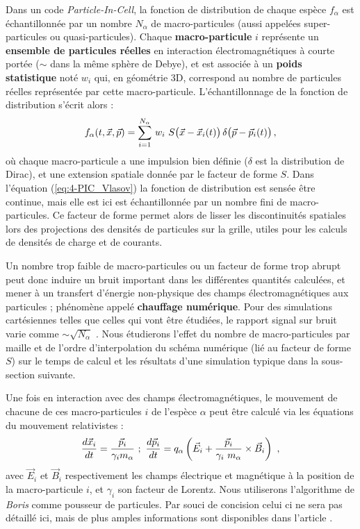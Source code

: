 \begin{refsection}
Dans un code \textit{Particle-In-Cell}, la fonction de distribution de chaque espèce $f_\alpha$ est échantillonnée par un nombre $N_\alpha$ de macro-particules (aussi appelées super-particules ou quasi-particules). Chaque \textbf{macro-particule} $i$ représente un \textbf{ensemble de particules réelles} en interaction électromagnétiques à courte portée ($\sim$ dans la même sphère de Debye), et est associée à un \textbf{poids statistique} noté $w_i$ qui, en géométrie 3D, correspond au nombre de particules réelles représentée par cette macro-particule. 
L'échantillonnage de la fonction de distribution s'écrit alors \parencite{derouillat_2018} :
\begin{equation}
f_\alpha(t,\vec{x},\vec{p}) =
    \sum_{i=1}^{N_\alpha}\,w_i\,\,S\big(\vec{x}-\vec{x}_i(t)\big)\,\delta\big(\vec{p}-\vec{p}_i(t)\big)\,\rm ,
\end{equation}
où chaque macro-particule a une impulsion bien définie ($\delta$ est la distribution de Dirac), et une extension spatiale donnée par le facteur de forme $S$. Dans l'équation (\ref{eq:4-PIC_Vlasov}) la fonction de distribution est sensée être continue, mais elle est ici est échantillonnée par un nombre fini de macro-particules. Ce facteur de forme permet alors de lisser les discontinuités spatiales lors des projections des densités de particules sur la grille, utiles pour les calculs de densités de charge et de courants.

Un nombre trop faible de macro-particules ou un facteur de forme trop abrupt peut donc induire un bruit important dans les différentes quantités calculées, et mener à un transfert d'énergie non-physique des champs électromagnétiques aux particules ; phénomène appelé \textbf{chauffage numérique}. Pour des simulations cartésiennes telles que celles qui vont être étudiées, le rapport signal sur bruit varie comme $\sim \sqrt{N_\alpha}$ \parencite{lifschitz_2009}. Nous étudierons l'effet du nombre de macro-particules par maille et de l'ordre d'interpolation du schéma numérique (lié au facteur de forme $S$) sur le temps de calcul et les résultats d'une simulation typique dans la sous-section suivante.

Une fois en interaction avec des champs électromagnétiques, le mouvement de chacune de ces macro-particules $i$ de l'espèce $\alpha$ peut être calculé via les équations du mouvement relativistes :
\begin{equation}
    \dfrac{d \vec{x}_i}{d t} = \dfrac{\vec{p}_i}{\gamma_i m_\alpha} ~ ; ~
    \dfrac{d \vec{p}_i}{dt} =  q_\alpha \left(\vec{E}_i + \dfrac{\vec{p}_i}{\gamma_i ~ m_\alpha} \times \vec{B}_i\right)~ \rm ,
    \label{eq:4-PIC_mouvement_particules}
\end{equation}
avec $\vec{E}_i$ et $\vec{B}_i$ respectivement les champs électrique et magnétique à la position de la macro-particule $i$, et $\gamma_i$ son facteur de Lorentz. Nous utiliserons l'algorithme de \textit{Boris} comme pousseur de particules. Par souci de concision celui ci ne sera pas détaillé ici, mais de plus amples informations sont disponibles dans l'article \parencite{derouillat_2018}.


\end{refsection}
